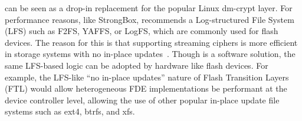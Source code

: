 

 \sys can be seen as a drop-in replacement for the popular
Linux dm-crypt layer. For performance reasons, like StrongBox, \sys recommends a
Log-structured File System (LFS) such as F2FS, YAFFS, or LogFS, which are
commonly used for flash devices. The reason for this is that supporting
streaming ciphers is more efficient in storage systems with no in-place
updates~\cite{StrongBox}. Though \sys is a software solution, the same LFS-based
logic can be adopted by hardware like flash devices. For example, the LFS-like
``no in-place updates'' nature of Flash Transition Layers (FTL) would allow
heterogeneous FDE implementations be performant at the device controller level,
allowing the use of other popular in-place update file systems such as ext4,
btrfs, and xfs.
